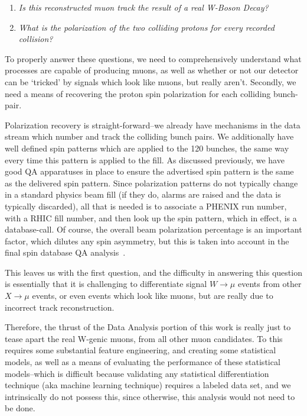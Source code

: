 \begin{enumerate}
  \item \textit{Is this reconstructed muon track the result of a real W-Boson Decay?}
  \item \textit{What is the polarization of the two colliding protons for every recorded collision?}
\end{enumerate}

To properly answer these questions, we need to comprehensively understand what
processes are capable of producing muons, as well as whether or not our detector
can be `tricked' by signals which look like muons, but really aren't. Secondly,
we need a means of recovering the proton spin polarization for each colliding
bunch-pair.

Polarization recovery is straight-forward--we already have mechanisms in the
data stream which number and track the colliding bunch pairs. We additionally
have well defined spin patterns which are applied to the 120 bunches, the same
way every time this pattern is applied to the fill. As discussed previously, we
have good QA apparatuses in place to ensure the advertised spin pattern is the
same as the delivered spin pattern. Since polarization patterns do not typically
change in a standard physics beam fill (if they do, alarms are raised and the
data is typically discarded), all that is needed is to associate a PHENIX run
number, with a RHIC fill number, and then look up the spin pattern, which in
effect, is a database-call. Of course, the overall beam polarization percentage
is an important factor, which dilutes any spin asymmetry, but this is taken into
account in the final spin database QA analysis~\cite{Kim2014}.

This leaves us with the first question, and the difficulty in answering this
question is essentially that it is challenging to differentiate signal
$W\rightarrow\mu$ events from other $X\rightarrow\mu$ events, or even events
which look like muons, but are really due to incorrect track reconstruction.

Therefore, the thrust of the Data Analysis portion of this work is really just
to tease apart the real W-genic muons, from all other muon candidates. To this
requires some substantial feature engineering, and creating some statistical
models, as well as a means of evaluating the performance of these statistical
models--which is difficult because validating any statistical differentiation
technique (aka machine learning technique) requires a labeled data set, and we
intrinsically do not possess this, since otherwise, this analysis would not need
to be done.

